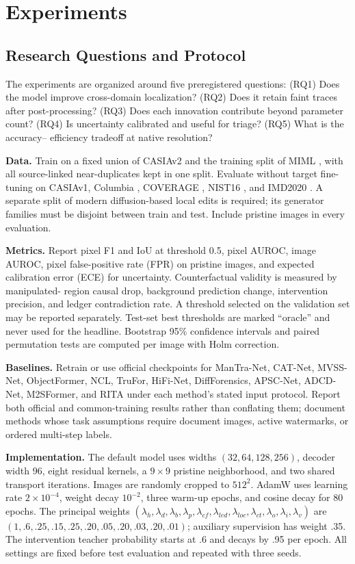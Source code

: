 \documentclass[journal]{IEEEtran}
\begin{document}
\fi
\section{Experiments}
\subsection{Research Questions and Protocol}
The experiments are organized around five preregistered questions: (RQ1) Does the
model improve cross-domain localization? (RQ2) Does it retain faint traces after
post-processing? (RQ3) Does each innovation contribute beyond parameter count?
(RQ4) Is uncertainty calibrated and useful for triage? (RQ5) What is the accuracy--
efficiency tradeoff at native resolution?

\textbf{Data.} Train on a fixed union of CASIAv2 \cite{dong2013casia} and the
training split of MIML \cite{qu2024modern}, with all source-linked near-duplicates
kept in one split.  Evaluate without target fine-tuning on CASIAv1, Columbia
\cite{hsu2006columbia}, COVERAGE \cite{wen2016coverage}, NIST16
\cite{guan2019nist}, and IMD2020 \cite{novozamsky2020imd}.  A separate split of
modern diffusion-based local edits is required; its generator families must be
disjoint between train and test.  Include pristine images in every evaluation.

\textbf{Metrics.} Report pixel F1 and IoU at threshold 0.5, pixel AUROC, image
AUROC, pixel false-positive rate (FPR) on pristine images, and expected calibration
error (ECE) for uncertainty. Counterfactual validity is measured by manipulated-
region causal drop, background prediction change, intervention precision, and
ledger contradiction rate. A threshold selected on the validation set may be
reported separately.  Test-set best thresholds are marked ``oracle'' and never
used for the headline.  Bootstrap 95\% confidence intervals and paired permutation
tests are computed per image with Holm correction.

\textbf{Baselines.} Retrain or use official checkpoints for ManTra-Net, CAT-Net,
MVSS-Net, ObjectFormer, NCL, TruFor, HiFi-Net, DiffForensics, APSC-Net, ADCD-Net,
M2SFormer, and RITA under each method's stated input protocol. Report both
official and common-training results rather than conflating them; document methods
whose task assumptions require document images, active watermarks, or ordered
multi-step labels.

\textbf{Implementation.} The default model uses widths $(32,64,128,256)$, decoder
width 96, eight residual kernels, a $9\times9$ pristine neighborhood, and two
shared transport iterations. Images are randomly
cropped to $512^2$.  AdamW uses learning rate $2\!\times\!10^{-4}$, weight decay
$10^{-2}$, three warm-up epochs, and cosine decay for 80 epochs. The principal
weights $(\lambda_h,\lambda_d,\lambda_b,\lambda_p,\lambda_{cf},\lambda_{led},
\lambda_{loc},\lambda_{ct},\lambda_o,\lambda_i,\lambda_v)$ are
$(1,.6,.25,.15,.25,.20,.05,.20,.03,.20,.01)$; auxiliary supervision has weight
.35. The intervention teacher probability starts at .6 and decays by .95 per
epoch. All settings are fixed before test evaluation and repeated with three
seeds.
\end{document}
